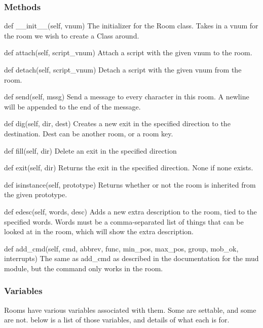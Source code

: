\documentclass[12pt]{article}
\begin{document}
\subsubsection{Methods}
def \_\_init\_\_(self, vnum) \newline
The initializer for the Room class. Takes in a vnum for the room we wish to create a Class around.

def attach(self, script\_vnum) \newline
Attach a script with the given vnum to the room.

def detach(self, script\_vnum) \newline
Detach a script with the given vnum from the room.

def send(self, mssg) \newline
Send a message to every character in this room. A newline will be appended to the end of the message.

def dig(self, dir, dest) \newline
Creates a new exit in the specified direction to the destination. Dest can be another room, or a room key.

def fill(self, dir) \newline
Delete an exit in the specified direction

def exit(self, dir) \newline
Returns the exit in the specified direction. None if none exists.

def isinstance(self, prototype) \newline
Returns whether or not the room is inherited from the given prototype.

def edesc(self, words, desc) \newline
Adds a new extra description to the room, tied to the specified words. Words must be a comma-separated list of things that can be looked at in the room, which will show the extra description.

def add\_cmd(self, cmd, abbrev, func, min\_pos, max\_pos, group, 
             mob\_ok, interrupts)
The same as add\_cmd as described in the documentation for the mud module, but the command only works in the room.


\subsubsection{Variables}
Rooms have various variables associated with them. Some are settable, and some are not. below is a list of those variables, and details of what each is for.
\end{document}
